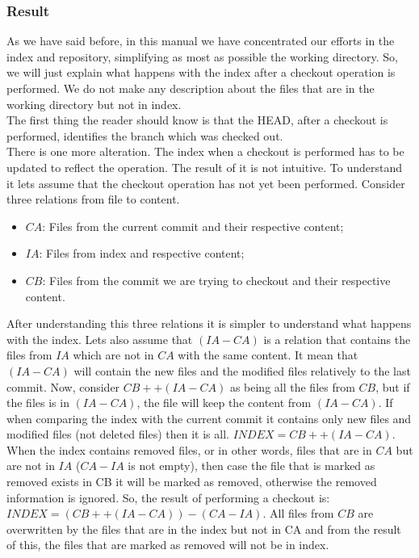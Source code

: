 \subsubsection{Result}
As we have said before, in this manual we have
concentrated our efforts in the index and repository, simplifying as
most as possible the working directory. So, we will just explain what
happens with the index after a checkout operation is performed. We do
not make any description about the files that are in the working directory
but not in index.\\

The first thing the reader should know is that the
HEAD, after a checkout is performed, identifies the branch which was
checked out.\\

There is one more alteration. The index when a checkout is performed
has to be updated to reflect the operation. The result of it is not intuitive. To
understand it lets assume that the checkout operation has not yet been 
performed. Consider three relations from file to content. 
\begin{itemize}
   \item $CA$: Files from the current commit and their
   respective content;
   \item $IA$: Files from index and respective content;
   \item $CB$: Files from the commit we are trying to checkout
   and their respective content.
\end{itemize}
After understanding this three relations it is simpler to understand
what happens with the index. Lets also assume that $(IA-CA)$ is a relation that
contains the files from $IA$ which are not in $CA$ with the same content.
It mean that $(IA-CA)$ will contain the new files and the modified files relatively to
the last commit. Now, consider $CB ++ (IA-CA)$ as being all the files
from $CB$, but if the files is in $(IA-CA)$, the file will keep the
content from $(IA-CA)$. If when comparing the index with the current
commit it contains only new files and modified files (not deleted
files) then it is all. $INDEX = CB ++ (IA-CA)$. When the index
contains removed files, or in other words, files that are in $CA$ but are not in
$IA$ ($CA-IA$ is not empty), then case the file that is marked as removed exists
in CB it will be marked as removed, otherwise the removed information is
ignored. So, the result of performing a checkout is: $INDEX = (CB ++
(IA-CA)) - (CA-IA)$. All files from $CB$ are overwritten by the files
that are in the index but not in CA and from the result of this, the
files that are marked as removed will not be in index.

